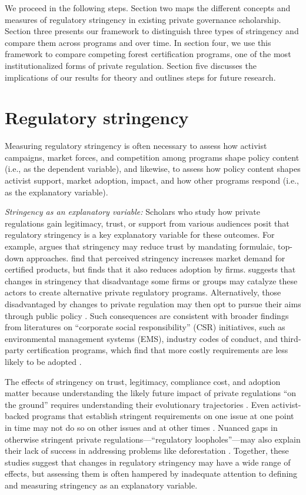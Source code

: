 \documentclass[
      12pt,
            Review ]{article}
\begin{document}
We proceed in the following steps. Section two maps the different
concepts and measures of regulatory stringency in existing private
governance scholarship. Section three presents our framework to
distinguish three types of stringency and compare them across programs
and over time. In section four, we use this framework to compare
competing forest certification programs, one of the most
institutionalized forms of private regulation. Section five discusses
the implications of our results for theory and outlines steps for future
research.

\section{Regulatory stringency}\label{regulatory-stringency}

Measuring regulatory stringency is often necessary to assess how
activist campaigns, market forces, and competition among programs shape
policy content (i.e., as the dependent variable), and likewise, to
assess how policy content shapes activist support, market adoption,
impact, and how other programs respond (i.e., as the explanatory
variable).

\emph{Stringency as an explanatory variable:} Scholars who study how
private regulations gain legitimacy, trust, or support from various
audiences posit that regulatory stringency is a key explanatory variable
for these outcomes. For example, \citet{McDermott2012} argues that
stringency may reduce trust by mandating formulaic, top-down approaches.
\citet{Atkinson2014} find that perceived stringency increases market
demand for certified products, but \citet{Prado2013} finds that it also
reduces adoption by firms. \citet{Meidinger2003} suggests that changes
in stringency that disadvantage some firms or groups may catalyze these
actors to create alternative private regulatory programs. Alternatively,
those disadvantaged by changes to private regulation may then opt to
pursue their aims through public policy \citep{Weimer2006}. Such
consequences are consistent with broader findings from literatures on
``corporate social responsibility'' (CSR) initiatives, such as
environmental management systems (EMS), industry codes of conduct, and
third-party certification programs, which find that more costly
requirements are less likely to be adopted
\citep{Delmas2008, Kollman2001, Lyon2008}.

The effects of stringency on trust, legitimacy, compliance cost, and
adoption matter because understanding the likely future impact of
private regulations ``on the ground'' requires understanding their
evolutionary trajectories \citep{VanderVen2018}. Even activist-backed
programs that establish stringent requirements on one issue at one point
in time may not do so on other issues and at other times
\citep{LeBaron2018}. Nuanced gaps in otherwise stringent private
regulations---``regulatory loopholes''---may also explain their lack of
success in addressing problems like deforestation \citep{VanderVen2018}.
Together, these studies suggest that changes in regulatory stringency
may have a wide range of effects, but assessing them is often hampered
by inadequate attention to defining and measuring stringency as an
explanatory variable.
\end{document}
